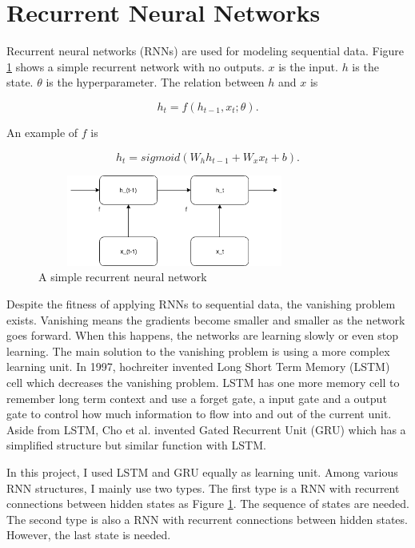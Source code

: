 \documentclass[modernstyle,12pt]{sjsuthesis}
\theoremstyle{definition}
\begin{document}
\section{Recurrent Neural Networks}\label{sect:rnn}

Recurrent neural networks (RNNs) \cite{rumelhart1986learning} are used for modeling sequential data. Figure \ref{f:rnnWithNoOutputs} shows a simple recurrent network with no outputs. $x$ is the input. $h$ is the state. $\theta$ is the hyperparameter. The relation between $h$ and $x$ is

$$h_t = f(h_{t-1}, x_t; \theta).$$

An example of $f$ is

$$h_t = sigmoid(W_h h_{t-1} + W_x x_t + b).$$

\begin{figure}[htbp]\centering
  \includegraphics[width=9cm, height=3cm]{figures/rnnWithNoOutputs}
  \caption{A simple recurrent neural network}
  \label{f:rnnWithNoOutputs}
\end{figure}



Despite the fitness of applying RNNs to sequential data, the vanishing problem exists. Vanishing means the gradients become smaller and smaller as the network goes forward. When this happens, the networks are learning slowly or even stop learning. The main solution to the vanishing problem is using a more complex learning unit. In 1997, hochreiter invented Long Short Term Memory (LSTM) cell \cite{hochreiter1997long} which decreases the vanishing problem. LSTM has one more memory cell to remember long term context and use a forget gate, a input gate and a output gate to control how much information to flow into and out of the current unit. Aside from LSTM, Cho et al. invented Gated Recurrent Unit (GRU)\cite{cho2014learning} which has a simplified structure but similar function with LSTM.


In this project, I used LSTM and GRU equally as learning unit. Among various RNN structures, I mainly use two types. The first type is a RNN with recurrent connections between hidden states as Figure \ref{f:rnnWithNoOutputs}. The sequence of  states are needed. The second type is also a RNN with recurrent connections between hidden states. However, the last state is needed.
\end{document}
